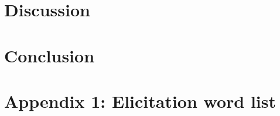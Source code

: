 \documentclass[12pt, letterpaper]{article}
\begin{document}
\section{Discussion} \label{sec:Discussion}


\section{Conclusion} \label{sec:Conclusions}



\printbibliography[heading=bibintoc]

\section*{Appendix 1: Elicitation word list}
\end{document}
